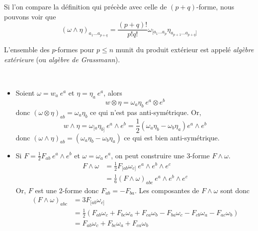 \documentclass[a4paper,11pt]{report}
\begin{document}
            Si l'on compare la définition qui précède avec celle de $(p+q)$-forme, nous pouvons voir que
            \begin{equation}
                (\omega\wedge\eta)_{a_1\dots a_{p+q}} = \frac{(p+q)!}{p!q!}\omega_{[a_1\dots a_p}\eta_{a_{p+1}\dots a_{p+q}]}
            \end{equation}
            
            \begin{definition}
                L'ensemble des $p$-formes pour $p\leq n$ munit du produit extérieur est appelé \textit{algèbre extérieure} (ou \textit{algèbre de Grassmann}).
            \end{definition}
            
            \begin{exmp}${}$
            \begin{itemize}[label = \textbullet]
                \item Soient $\omega = w_a ~e^a$ et $\eta = \eta_a ~e^a$, alors
                    \begin{equation}
                        w\otimes\eta = \omega_a\eta_b~ e^a\otimes e^b
                    \end{equation}
                    donc $(\omega\otimes\eta)_{ab} =\omega_a\eta_b$ ce qui n'est pas anti-symétrique. Or,
                    \begin{equation}
                        w\wedge\eta = \omega_{[a}\eta_{b]}~e^a\wedge e^b = \frac{1}{2}(\omega_a \eta_b-\omega_b\eta_a)e^a\wedge e^b
                    \end{equation}
                    donc $(\omega\wedge\eta)_{ab} =(\omega_a\eta_b-\omega_b\eta_a)$ ce qui est bien anti-symétrique.
                \item Si $F = \frac{1}{2} F_{ab}~e^a\wedge e^b$ et $\omega = \omega_a~ e^a$, on peut construire une 3-forme $F\wedge\omega$.
                \begin{align}
                    F\wedge\omega &= \frac{1}{2}F_{[ab}\omega_{c]}~e^a\wedge e^b \wedge e^c\\
                    &= \frac{1}{6}(F\wedge\omega)_{abc}~e^a\wedge e^b \wedge e^c
                \end{align}
                Or, $F$ est une 2-forme donc $F_{ab} = -F_{ba}$. Les composantes de $F\wedge\omega$ sont donc
                \begin{align}
                    (F\wedge\omega)_{abc} &= 3 F_{[ab}\omega_{c]}\\
                    &= \frac{1}{2}\left(F_{ab}\omega_c+F_{bc}\omega_a+F_{ca}\omega_b-F_{ba}\omega_c-F_{cb}\omega_a-F_{ac}\omega_b\right)\\
                    &= F_{ab}\omega_c+F_{bc}\omega_a+F_{ca}\omega_b
                \end{align}
            \end{itemize}
            \end{exmp}
            
\end{document}
